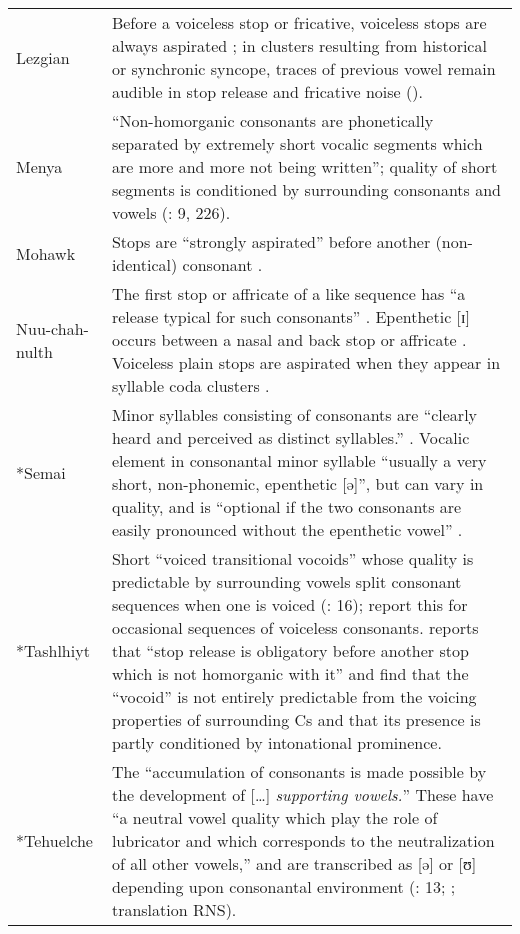 \begin{longtable}{p{55pt}p{278.6pt}}
{Lezgian} & Before a voiceless stop or fricative, voiceless stops are always aspirated \citep[47]{Haspelmath1993}; in clusters resulting from historical or synchronic syncope, traces of previous vowel remain audible in stop release and fricative noise (\citealt{ChitoranBabaliyeva2007}).\\
{Menya} & “Non-homorganic consonants are phonetically separated by extremely short vocalic segments which are more and more not being written”; quality of short segments is conditioned by surrounding consonants and vowels (\citealt{Whitehead2004}: 9, 226).\\
{Mohawk} & Stops are “strongly aspirated” before another (non-identical) consonant \citep[28]{Bonvillain1973}.\\
{Nuu-chah-nulth} & The first stop or affricate of a like sequence has “a release typical for such consonants” \citep[163--4]{Kim2003}. Epenthetic [ɪ] occurs between a nasal and back stop or affricate \citep[26-7]{Rose1981}. Voiceless plain stops are aspirated when they appear in syllable coda clusters \citep[12]{Davidson2002}.\\
{*Semai} & Minor syllables consisting of consonants are “clearly heard and perceived as distinct syllables.” \citep[321]{Sloan1988}. Vocalic element in consonantal minor syllable “usually a very short, non-phonemic, epenthetic [ə]”, but can vary in quality, and is “optional if the two consonants are easily pronounced without the epenthetic vowel” \citep[2]{Philips2007}.\\
{*Tashlhiyt} & Short “voiced transitional vocoids” whose quality is predictable by surrounding vowels split consonant sequences when one is voiced (\citealt{DellElmedlaoui2002}: 16); \citet[16]{GordonNafi2012} report this for occasional sequences of voiceless consonants. \citet[210]{Ridouane2008} reports that “stop release is obligatory before another stop which is not homorganic with it” and \citet{GriceEtAl2015} find that the “vocoid” is not entirely predictable from the voicing properties of surrounding Cs and that its presence is partly conditioned by intonational prominence.\\
{*Tehuelche} & The “accumulation of consonants is made possible by the development of […] \textit{supporting vowels.}” These have “a neutral vowel quality which play the role of lubricator and which corresponds to the neutralization of all other vowels,” and are transcribed as [ə] or [ʊ] depending upon consonantal environment (\citealt{FernándezGarayHernández2006}: 13;  \citealt{FernándezGaray1998}; translation RNS).\\

\end{longtable}
